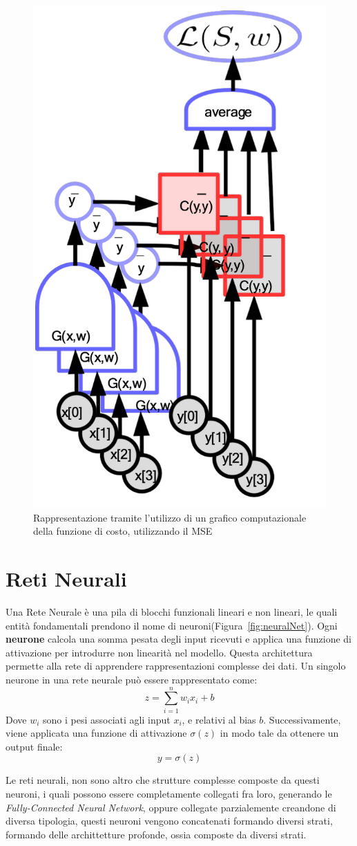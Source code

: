 \begin{figure}
    \centering
    \includegraphics[width=0.30\linewidth]{figure/CostFunction.png}
    \caption{Rappresentazione tramite l'utilizzo di un grafico computazionale della funzione di costo, utilizzando il MSE}
    \label{fig:costFunction}
\end{figure}

\section{Reti Neurali}
Una Rete Neurale è una pila di blocchi funzionali lineari e non lineari, le quali entità fondamentali prendono il nome di neuroni(Figura~\ref{fig:neuralNet}). Ogni \textbf{neurone} calcola una somma pesata degli input ricevuti e applica una funzione di attivazione per introdurre non linearità nel modello. Questa architettura permette alla rete di apprendere rappresentazioni complesse dei dati. Un singolo neurone in una rete neurale può essere rappresentato come:
\begin{equation}
    z = \sum_{i=1}^{n} w_i x_i + b
\end{equation}
Dove $w_i$ sono i pesi associati agli input $x_i$, e relativi al bias $b$. Successivamente, viene applicata una funzione di attivazione $\sigma(z)$ in modo tale da ottenere un output finale:
\begin{equation}
    y = \sigma(z)
\end{equation}

Le reti neurali, non sono altro che strutture complesse composte da questi neuroni, i quali possono essere completamente collegati fra loro, generando le \textit{Fully-Connected Neural Network}, oppure collegate parzialemente creandone di diversa tipologia, questi neuroni vengono concatenati formando diversi strati, formando delle archittetture profonde, ossia composte da diversi strati.

